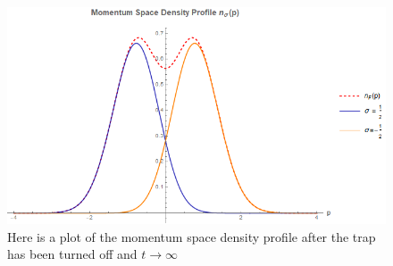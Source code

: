 \documentclass[onecolumn,english,aps,pra]{revtex4}
\begin{document}
\begin{figure}[h]
\includegraphics[scale=0.6]{"../Plots/MomentumSpaceDProfileMixedSpinorDF"}
\caption{Here is a plot of the momentum space density profile after the trap has been turned off and $t \rightarrow \infty$}
\label{nsRSDP-DF}
\end{figure}
\pagebreak



\end{document}
